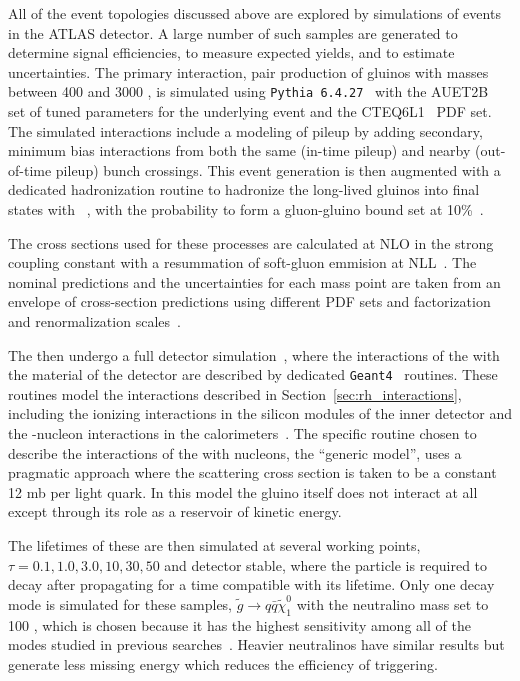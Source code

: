 All of the event topologies discussed above are explored by simulations of \rhadron events in the ATLAS detector. 
A large number of such samples are generated to determine signal efficiencies, to measure expected yields, and to estimate uncertainties. 
The primary interaction, pair production of gluinos with masses between 400 and 3000 \GeV, is simulated using \texttt{Pythia 6.4.27}~\cite{pythia6}  with the AUET2B~\cite{ATL-PHYS-PUB-2011-014} set of tuned parameters for the underlying event and the CTEQ6L1~\cite{CTEQ} \ac{PDF} set.
The simulated interactions include a modeling of pileup by adding secondary, minimum bias interactions from both the same (in-time pileup) and nearby (out-of-time pileup) bunch crossings.
This event generation is then augmented with a dedicated hadronization routine to hadronize the long-lived gluinos into final states with \rhadrons~\cite{heavy_hadronization}, with the probability to form a gluon-gluino bound set at 10\%~\cite{Fairbairn:2006gg}.

The cross sections used for these processes are calculated at \ac{NLO} in the strong coupling constant with a resummation of soft-gluon emmision at \ac{NLL}~\cite{Beenakker:1996ch,Kulesza:2008jb,Kulesza:2009kq,Beenakker:2009ha,Beenakker:2011fu}.
The nominal predictions and the uncertainties for each mass point are taken from an envelope of cross-section predictions using different \ac{PDF} sets and factorization and renormalization scales~\cite{Kramer:2012bx}.

The \rhadrons then undergo a full detector simulation~\cite{}, where the interactions of the \rhadrons with the material of the detector are described by dedicated \texttt{Geant4}~\cite{GEANT4} routines. 
These routines model the interactions described in Section~\ref{sec:rh_interactions}, including the ionizing interactions in the silicon modules of the inner detector and the \rhadron-nucleon interactions in the calorimeters~\cite{Mackeprang:2006gx, Mackeprang:2009ad}.
The specific routine chosen to describe the interactions of the \rhadrons with nucleons, the ``generic model'', uses a pragmatic approach where the scattering cross section is taken to be a constant 12 mb per light quark.
In this model the gluino itself does not interact at all except through its role as a reservoir of kinetic energy.

The lifetimes of these \rhadrons are then simulated at several working points, $\tau = 0.1, 1.0, 3.0, 10, 30, 50$ and detector stable, where the particle is required to decay after propagating for a time compatible with its lifetime.
Only one decay mode is simulated for these samples, $\tilde{g} \rightarrow q\bar{q}\tilde{\chi}_1^0$ with the neutralino mass set to 100 \GeV, which is chosen because it has the highest sensitivity among all of the modes studied in previous searches~\cite{SUSY-2014-09}.
Heavier neutralinos have similar results but generate less missing energy which reduces the efficiency of triggering.

